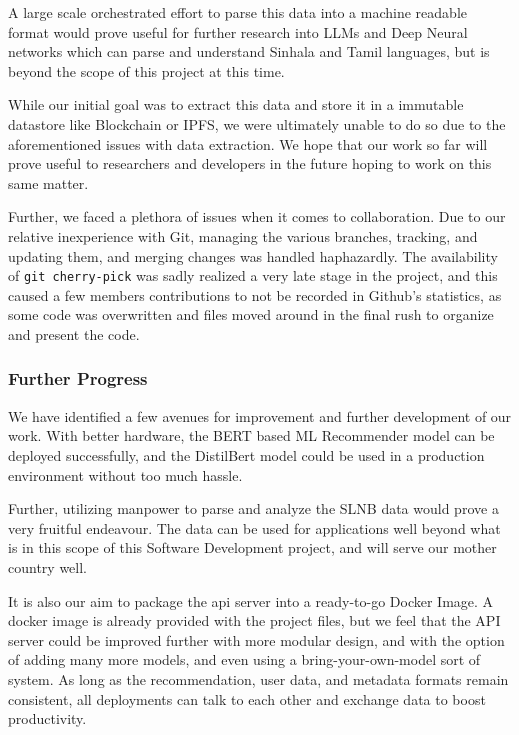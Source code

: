 A large scale orchestrated effort to parse this data into a machine readable format would prove useful for further research into LLMs and Deep Neural networks which can parse and understand Sinhala and Tamil languages, but is beyond the scope of this project at this time.

While our initial goal was to extract this data and store it in a immutable datastore like Blockchain or IPFS, we were ultimately unable to do so due to the aforementioned issues with data extraction. We hope that our work so far will prove useful to researchers and developers in the future hoping to work on this same matter.

Further, we faced a plethora of issues when it comes to collaboration. Due to our relative inexperience with Git, managing the various branches, tracking, and updating them, and merging changes was handled haphazardly. The availability of \texttt{git cherry-pick} was sadly realized a very late stage in the project, and this caused a few members contributions to not be recorded in Github's statistics, as some code was overwritten and files moved around in the final rush to organize and present the code.

\subsubsection*{Further Progress}
We have identified a few avenues for improvement and further development of our work. With better hardware, the BERT based ML Recommender model can be deployed successfully, and the DistilBert model could be used in a production environment without too much hassle.

Further, utilizing manpower to parse and analyze the SLNB data would prove a very fruitful endeavour. The data can be used for applications well beyond what is in this scope of this Software Development project, and will serve our mother country well.

It is also our aim to package the api server into a ready-to-go Docker Image. A docker image is already provided with the project files, but we feel that the API server could be improved further with more modular design, and with the option of adding many more models, and even using a bring-your-own-model sort of system. As long as the recommendation, user data, and metadata formats remain consistent, all deployments can talk to each other and exchange data to boost productivity.